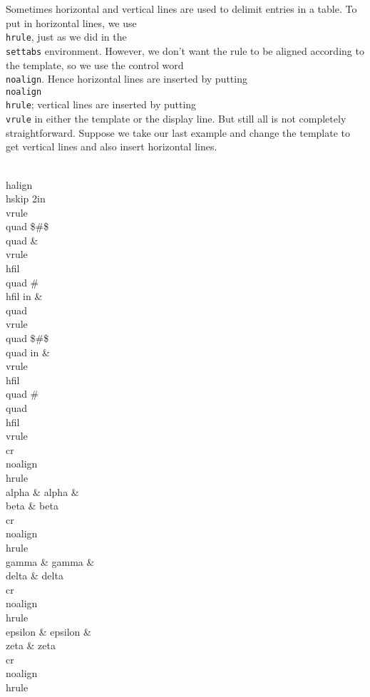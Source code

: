 Sometimes horizontal and vertical lines are used to delimit 
entries in a table.  To put in horizontal lines, we use {\tt \\hrule}, 
just as we did in the {\tt \\settabs} environment. 
However, we don't want the rule to be aligned according to the 
template, so we use the control word {\tt \\noalign}.  Hence 
horizontal lines are inserted by putting {\tt \\noalign\lb\\hrule\rb}; 
vertical lines are inserted by putting {\tt \\vrule} 
in either the template or the display line. But still all is not 
completely straightforward.  Suppose we take our last example and 
change the template to get vertical lines and also insert 
horizontal lines. 
 
\beginuser 
\\halign\lb\\hskip 2in\\vrule\\quad \$\#\$\\quad \& \\vrule \\hfil\\quad %
\# \\hfil 
{} in \& \\quad \\vrule \\quad \$\#\$\\quad 
{} in \& \\vrule\\hfil \\quad \# \\quad \\hfil \\vrule \\cr 
\\noalign\lb\\hrule\rb 
\\alpha   \& alpha   \& \\beta  \& beta \\cr 
\\noalign\lb\\hrule\rb 
\\gamma   \& gamma   \& \\delta \& delta \\cr 
\\noalign\lb\\hrule\rb 
\\epsilon \& epsilon \& \\zeta  \& zeta \\cr 
\\noalign\lb\\hrule\rb 
\rb 
\enduser 
 
